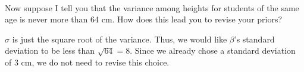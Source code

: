 \documentclass[12pt]{article}\usepackage[]{graphicx}\usepackage[]{color}
\newenvironment{problem}[2][Problem]{\begin{trivlist}
\item[\hskip \labelsep {\bfseries #1}\hskip \labelsep {\bfseries #2.}]}{\end{trivlist}}
\begin{document}
\begin{problem}{4M6}
\text{}\\
Now suppose I tell you that the variance among heights for students of the same age is never more than 64 cm. How does this lead you to revise your priors?
\end{problem}

$\sigma$ is just the square root of the variance. Thus, we would like $\beta$'s standard deviation to be less than $\sqrt{64}=8$. Since we already chose a standard deviation of 3 cm, we do not need to revise this choice.
\end{document}
